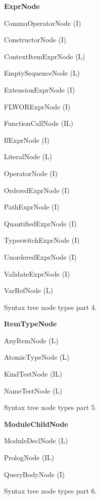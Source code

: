 \begin{figure}
\caption{Syntax tree node types part 4.}
\label{FIG_syntax_tree_node_types_part_4}
\begin{description}
\item \textbf{ExprNode}
  \begin{description}
  \item CommaOperatorNode (I)
  \item ConstructorNode (I)
  \item ContextItemExprNode (L)
  \item EmptySequenceNode (L)
  \item ExtensionExprNode (I)
  \item FLWORExprNode (I)
  \item FunctionCallNode (IL)
  \item IfExprNode (I)
  \item LiteralNode (L)
  \item OperatorNode (I)
  \item OrderedExprNode (I)
  \item PathExprNode (I)
  \item QuantifiedExprNode (I)
  \item TypeswitchExprNode (I)
  \item UnorderedExprNode (I)
  \item ValidateExprNode (I)
  \item VarRefNode (L)
  \end{description}
\end{description}
\end{figure}

\begin{figure}
\caption{Syntax tree node types part 5.}
\label{FIG_syntax_tree_node_types_part_5}
\begin{description}
\item \textbf{ItemTypeNode}
  \begin{description}
  \item AnyItemNode (L)
  \item AtomicTypeNode (L)
  \item KindTestNode (IL)
  \item NameTestNode (L)
  \end{description}
\end{description}
\end{figure}

\begin{figure}
\caption{Syntax tree node types part 6.}
\label{FIG_syntax_tree_node_types_part_6}
\begin{description}
\item \textbf{ModuleChildNode}
  \begin{description}
  \item ModuleDeclNode (L)
  \item PrologNode (IL)
  \item QueryBodyNode (I)
  \end{description}
\end{description}
\end{figure}

